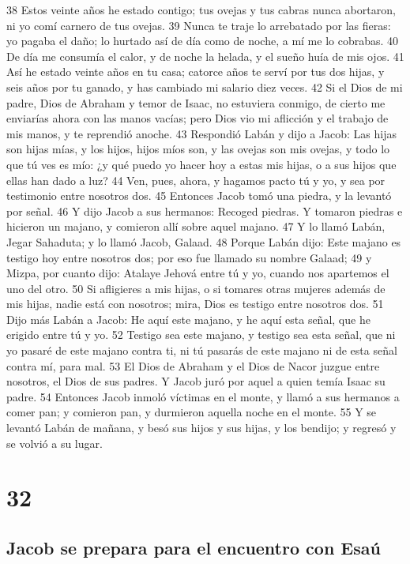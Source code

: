 38 Estos veinte años he estado contigo; tus ovejas y tus cabras nunca abortaron, ni yo comí carnero de tus ovejas.
39 Nunca te traje lo arrebatado por las fieras: yo pagaba el daño; lo hurtado así de día como de noche, a mí me lo cobrabas.
40 De día me consumía el calor, y de noche la helada, y el sueño huía de mis ojos.
41 Así he estado veinte años en tu casa; catorce años te serví por tus dos hijas, y seis años por tu ganado, y has cambiado mi salario diez veces.
42 Si el Dios de mi padre, Dios de Abraham y temor de Isaac, no estuviera conmigo, de cierto me enviarías ahora con las manos vacías; pero Dios vio mi aflicción y el trabajo de mis manos, y te reprendió anoche.
43 Respondió Labán y dijo a Jacob: Las hijas son hijas mías, y los hijos, hijos míos son, y las ovejas son mis ovejas, y todo lo que tú ves es mío: ¿y qué puedo yo hacer hoy a estas mis hijas, o a sus hijos que ellas han dado a luz?
44 Ven, pues, ahora, y hagamos pacto tú y yo, y sea por testimonio entre nosotros dos.
45 Entonces Jacob tomó una piedra, y la levantó por señal.
46 Y dijo Jacob a sus hermanos: Recoged piedras. Y tomaron piedras e hicieron un majano, y comieron allí sobre aquel majano.
47 Y lo llamó Labán, Jegar Sahaduta; y lo llamó Jacob, Galaad.
48 Porque Labán dijo: Este majano es testigo hoy entre nosotros dos; por eso fue llamado su nombre Galaad;
49 y Mizpa, por cuanto dijo: Atalaye Jehová entre tú y yo, cuando nos apartemos el uno del otro.
50 Si afligieres a mis hijas, o si tomares otras mujeres además de mis hijas, nadie está con nosotros; mira, Dios es testigo entre nosotros dos.
51 Dijo más Labán a Jacob: He aquí este majano, y he aquí esta señal, que he erigido entre tú y yo.
52 Testigo sea este majano, y testigo sea esta señal, que ni yo pasaré de este majano contra ti, ni tú pasarás de este majano ni de esta señal contra mí, para mal.
53 El Dios de Abraham y el Dios de Nacor juzgue entre nosotros, el Dios de sus padres. Y Jacob juró por aquel a quien temía Isaac su padre.
54 Entonces Jacob inmoló víctimas en el monte, y llamó a sus hermanos a comer pan; y comieron pan, y durmieron aquella noche en el monte.
55 Y se levantó Labán de mañana, y besó sus hijos y sus hijas, y los bendijo; y regresó y se volvió a su lugar.

\chapter{32}

\section{Jacob se prepara para el encuentro con Esaú}


